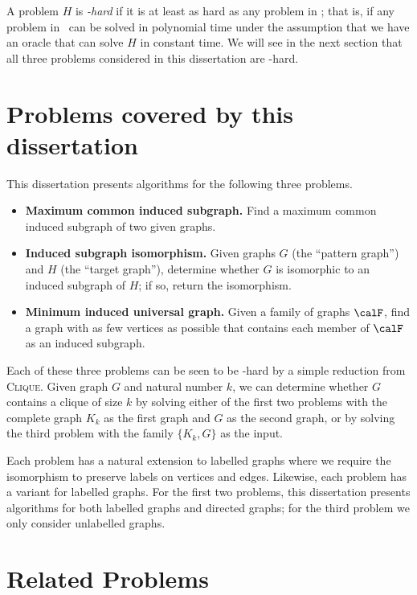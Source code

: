 A problem $H$ is \emph{\NP-hard} if it is at least as hard as any problem in \NP;
that is, if any problem in \NP\ can be solved in polynomial time under the assumption
that we have an oracle that can solve $H$ in constant time.  We will see in the next
section that all three problems considered in this dissertation are \NP-hard.

\section{Problems covered by this dissertation}\label{sec:problems}

This dissertation presents algorithms for the following three problems.

\begin{itemize}
    \item \textbf{Maximum common induced subgraph.} Find
a maximum common induced subgraph of two given graphs.
    \item \textbf{Induced subgraph isomorphism.} Given graphs $G$ (the ``pattern graph'')
    and $H$ (the ``target graph''),
determine whether $G$ is isomorphic to an induced subgraph of $H$;
if so, return the isomorphism.
    \item \textbf{Minimum induced universal graph.} Given a family of graphs $\calF$,
find a graph with as few vertices as possible that contains each member of $\calF$
as an induced subgraph.
\end{itemize}

Each
of these three problems can be seen to be \NP-hard by a simple reduction from
\textsc{Clique}.
Given graph $G$ and natural number $k$, we can determine whether $G$ contains a clique
of size $k$ by solving either of the first two problems with the complete graph $K_k$ as
the first graph and $G$ as the second graph, or by solving the third problem with the family
$\{K_k, G\}$ as the input.

Each problem has a natural extension to labelled graphs
where we require the isomorphism to preserve labels on vertices and edges.
Likewise, each problem has a variant for labelled graphs.
For the first two problems, this dissertation presents algorithms for both
labelled graphs and directed graphs; for the third problem we only consider
unlabelled graphs.

\section{Related Problems}\label{sec:related-problems}

